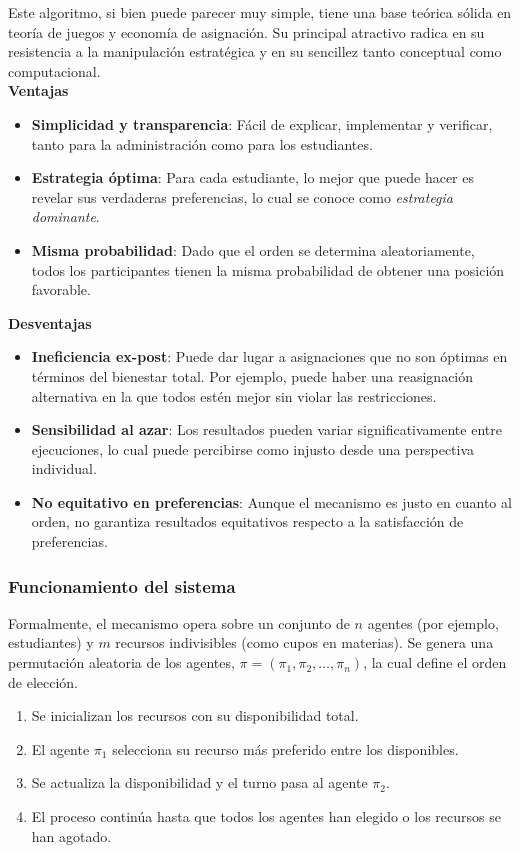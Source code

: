 \documentclass{article}
\begin{document}
Este algoritmo, si bien puede parecer muy simple, tiene una base teórica sólida en teoría de juegos y economía de asignación. Su principal atractivo radica en su resistencia a la manipulación estratégica y en su sencillez tanto conceptual como computacional.\\

\textbf{Ventajas}
\begin{itemize}
    \item \textbf{Simplicidad y transparencia}: Fácil de explicar, implementar y verificar, tanto para la administración como para los estudiantes.
    \item \textbf{Estrategia óptima}: Para cada estudiante, lo mejor que puede hacer es revelar sus verdaderas preferencias, lo cual se conoce como \textit{estrategia dominante}.
    \item \textbf{Misma probabilidad}: Dado que el orden se determina aleatoriamente, todos los participantes tienen la misma probabilidad de obtener una posición favorable.
\end{itemize}

\textbf{Desventajas}
\begin{itemize}
    \item \textbf{Ineficiencia ex-post}: Puede dar lugar a asignaciones que no son óptimas en términos del bienestar total. Por ejemplo, puede haber una reasignación alternativa en la que todos estén mejor sin violar las restricciones.
    \item \textbf{Sensibilidad al azar}: Los resultados pueden variar significativamente entre ejecuciones, lo cual puede percibirse como injusto desde una perspectiva individual.
    \item \textbf{No equitativo en preferencias}: Aunque el mecanismo es justo en cuanto al orden, no garantiza resultados equitativos respecto a la satisfacción de preferencias.
\end{itemize}

\subsubsection{Funcionamiento del sistema}

Formalmente, el mecanismo opera sobre un conjunto de $n$ agentes (por ejemplo, estudiantes) y $m$ recursos indivisibles (como cupos en materias). Se genera una permutación aleatoria de los agentes, $\pi = (\pi_1, \pi_2, \ldots, \pi_n)$, la cual define el orden de elección.

\begin{enumerate}
    \item Se inicializan los recursos con su disponibilidad total.
    \item El agente $\pi_1$ selecciona su recurso más preferido entre los disponibles.
    \item Se actualiza la disponibilidad y el turno pasa al agente $\pi_2$.
    \item El proceso continúa hasta que todos los agentes han elegido o los recursos se han agotado.
\end{enumerate}
\end{document}
